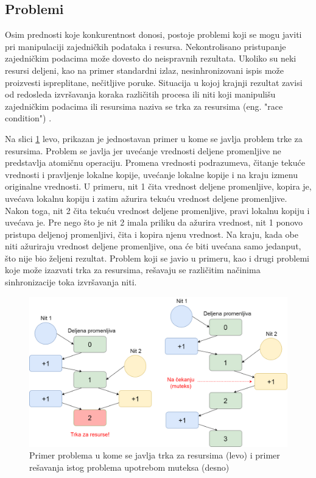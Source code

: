 \documentclass[12pt,oneside]{memoir}
\begin{document}
\subsection{Problemi}

Osim prednosti koje konkurentnost donosi, postoje problemi koji se mogu javiti pri manipulaciji zajedničkih podataka i resursa. Nekontrolisano pristupanje zajedničkim podacima može dovesto do neispravnih rezultata. Ukoliko su neki resursi deljeni, kao na primer standardni izlaz, nesinhronizovani ispis može proizvesti ispreplitane, nečitljive poruke. Situacija u kojoj krajnji rezultat zavisi od redosleda izvršavanja koraka različitih procesa ili niti koji manipulišu zajedničkim podacima ili resursima naziva se trka za resursima (eng. "race condition") \cite{os}.

Na slici \ref{fig:race} levo, prikazan je jednostavan primer u kome se javlja problem trke za resursima. Problem se javlja jer uvećanje vrednosti deljene promenljive ne predstavlja atomičnu operaciju. Promena vrednosti podrazumeva, čitanje tekuće vrednosti i pravljenje lokalne kopije, uvećanje lokalne kopije i na kraju izmenu originalne vrednosti. U primeru, nit 1 čita vrednost deljene promenljive, kopira je, uvećava lokalnu kopiju i zatim ažurira tekuću vrednost deljene promenljive. Nakon toga, nit 2 čita tekuću vrednost deljene promenljive, pravi lokalnu kopiju i uvećava je. Pre nego što je nit 2 imala priliku da ažurira vrednost, nit 1 ponovo pristupa deljenoj promenljivi, čita i kopira njenu vrednost. Na kraju, kada obe niti ažuriraju vrednost deljene promenljive, ona će biti uvećana samo jedanput, što nije bio željeni rezultat. Problem koji se javio u primeru, kao i drugi problemi koje može izazvati trka za resursima, rešavaju se različitim načinima sinhronizacije toka izvršavanja niti.

\begin{figure}
\begin{center}
\includegraphics[scale=0.22]{race.png}
\end{center}
\caption{Primer problema u kome se javlja trka za resursima (levo) i primer rešavanja istog problema upotrebom muteksa (desno) }
\label{fig:race}
\end{figure}
\end{document}
